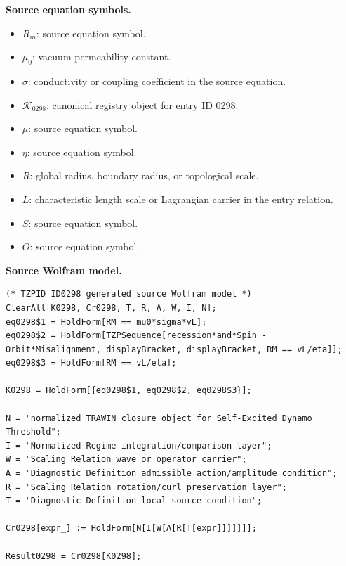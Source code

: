 \begin{minipage}[t]{0.49\linewidth}
\begingroup
\small
\raggedright
\textbf{Source equation symbols.}\par
\begin{itemize}[leftmargin=1.35em,itemsep=1pt,topsep=1pt,parsep=0pt]
    \item $R_m$: source equation symbol.
    \item $\mu_0$: vacuum permeability constant.
    \item $\sigma$: conductivity or coupling coefficient in the source equation.
    \item $\mathcal{K}_{0298}$: canonical registry object for entry ID 0298.
    \item $\mu$: source equation symbol.
    \item $\eta$: source equation symbol.
    \item $R$: global radius, boundary radius, or topological scale.
    \item $L$: characteristic length scale or Lagrangian carrier in the entry relation.
    \item $S$: source equation symbol.
    \item $O$: source equation symbol.
\end{itemize}
\endgroup
\end{minipage}\hfill
\begin{minipage}[t]{0.47\linewidth}
\begingroup
\scriptsize
\raggedright
\textbf{Source Wolfram model.}\par
\begin{Verbatim}[fontsize=\tiny,breaklines=true,breakanywhere=true]
(* TZPID ID0298 generated source Wolfram model *)
ClearAll[K0298, Cr0298, T, R, A, W, I, N];
eq0298$1 = HoldForm[RM == mu0*sigma*vL];
eq0298$2 = HoldForm[TZPSequence[recession*and*Spin - Orbit*Misalignment, displayBracket, displayBracket, RM == vL/eta]];
eq0298$3 = HoldForm[RM == vL/eta];

K0298 = HoldForm[{eq0298$1, eq0298$2, eq0298$3}];

N = "normalized TRAWIN closure object for Self-Excited Dynamo Threshold";
I = "Normalized Regime integration/comparison layer";
W = "Scaling Relation wave or operator carrier";
A = "Diagnostic Definition admissible action/amplitude condition";
R = "Scaling Relation rotation/curl preservation layer";
T = "Diagnostic Definition local source condition";

Cr0298[expr_] := HoldForm[N[I[W[A[R[T[expr]]]]]]];

Result0298 = Cr0298[K0298];
\end{Verbatim}
\endgroup
\end{minipage}

